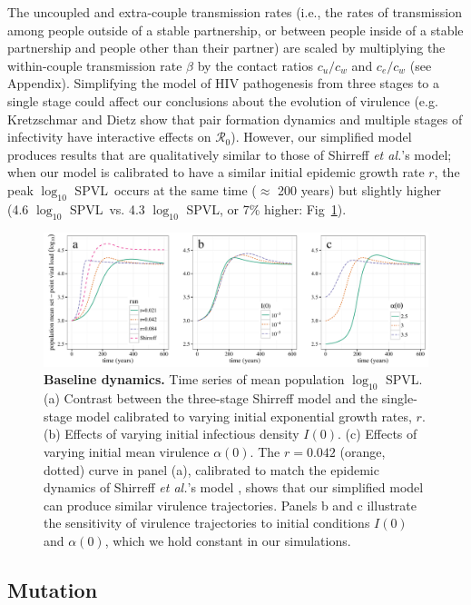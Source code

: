 \documentclass[10pt,letterpaper]{article}
\renewcommand{\figurename}{Fig}
\newcommand{\Lspvl}{$\log_{10}$ SPVL}
\newcommand{\rzero}{{\mathcal R}_0}
\newcommand{\etal}{\textit{et al.}}
\begin{document}
The uncoupled and extra-couple transmission rates (i.e., the rates of
transmission among people outside of a stable partnership, or between
people inside of a stable partnership and people other than their
partner) are scaled by
multiplying the within-couple transmission rate $\beta$ by the contact
ratios $c_u/c_w$ and $c_e/c_w$ (see Appendix). Simplifying the model
of HIV pathogenesis from three stages to a single stage could affect
our conclusions about the evolution of virulence (e.g. Kretzschmar and
Dietz \cite{kretzschmar_effect_1998} show that pair formation dynamics
and multiple stages of infectivity have interactive effects on
$\rzero$). However, our simplified model produces results that are
qualitatively similar to those of Shirreff \etal's
\cite{shirreff_transmission_2011} model; when our model is calibrated
to have a similar initial epidemic growth rate $r$, the peak
\Lspvl\ occurs at the same time ($\approx$ 200 years) but slightly
higher (4.6 \Lspvl\ vs. 4.3 \Lspvl, or 7\% higher: \figurename~\ref{fig:panel3}).

\begin{figure}[!ht]
\includegraphics[width=\textwidth]{../figures/fig1.pdf}
\caption{{\bf Baseline dynamics.}
Time series of mean population \Lspvl. (a) Contrast between the three-stage Shirreff model and the single-stage model calibrated to varying initial exponential growth rates, $r$. (b) Effects of varying initial infectious density $I(0)$. (c) Effects of varying initial mean virulence $\alpha(0)$. The $r=0.042$ (orange, dotted) curve in panel (a), calibrated to match the epidemic dynamics of Shirreff \etal's model \cite{shirreff_transmission_2011}, shows that our simplified model can produce similar virulence trajectories. Panels b and c illustrate the sensitivity of virulence trajectories to initial conditions $I(0)$ and $\alpha(0)$, which we hold constant in our simulations.}
\label{fig:panel3}
\end{figure}

\subsection*{Mutation}
\end{document}
